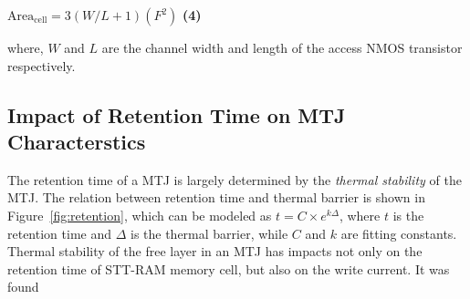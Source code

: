  {
 \small{
 \hspace{55mm} $\mathrm{Area}_{\mathrm{cell}}={3\left(W/L+1\right)}(F^2)$ \hspace{3mm} \textbf{(4)}
 }
 }

where, $W$ and $L$ are the channel width and length of the access NMOS transistor respectively.

\subsection{Impact of Retention Time on MTJ Characterstics} \label{subsec:retention}



The retention time of a MTJ is largely determined by the \textit{thermal stability} of the MTJ. The relation
between retention time and thermal barrier is shown in Figure~\ref{fig:retention}, which can be
modeled as $t=C\times e^{k\Delta}$, where $t$ is the retention time and $\Delta$ is the thermal
barrier, while $C$ and $k$ are fitting constants. Thermal stability of the free layer in an MTJ has impacts not
only on the retention time of STT-RAM memory cell, but also on the write current. It was found
